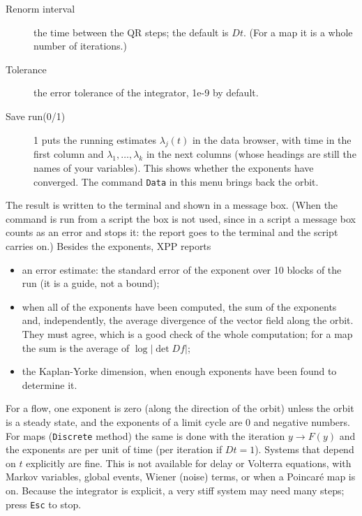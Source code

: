 \documentclass{article}
\begin{document}
\begin{description}
\begin{description}
\begin{description}
\item[Renorm interval] the time between the QR steps; the default is $Dt$.  (For a map it is a whole number of iterations.)
\item[Tolerance] the error tolerance of the integrator, 1e-9 by default.
\item[Save run(0/1)] 1 puts the running estimates $\lambda_j(t)$ in the data browser, with time in the first column and
$\lambda_1,\ldots,\lambda_k$ in the next columns (whose headings are still the names of your variables).  This shows whether the
exponents have converged.  The command {\tt Data} in this menu brings back the orbit.
\end{description}
The result is written to the terminal and shown in a message box.  (When the command is run from a script the box is not used,
since in a script a message box counts as an error and stops it: the report goes to the terminal and the script carries on.)
Besides the exponents, XPP reports
\begin{itemize}
\item an error estimate: the standard error of the exponent over 10 blocks of the run (it is a guide, not a bound);
\item when all of the exponents have been computed, the sum of the exponents and, independently, the average divergence of the vector field
along the orbit.  They must agree, which is a good check of the whole computation; for a map the sum is the average of
$\log|\det Df|$;
\item the Kaplan-Yorke dimension, when enough exponents have been found to determine it.
\end{itemize}
For a flow, one exponent is zero (along the direction of the orbit) unless the orbit is a steady state, and the
exponents of a limit cycle are $0$ and negative numbers.  For maps ({\tt Discrete} method) the same is done with the
iteration $y\to F(y)$ and the exponents are per unit of time (per iteration if $Dt=1$).  Systems that depend on $t$ explicitly are fine.
This is not available for delay or Volterra equations, with Markov variables, global events, Wiener (noise) terms, or when a
Poincar\'e map is on.  Because the integrator is explicit, a very stiff system may need many steps; press {\tt Esc} to stop.


\end{description}
\end{description}
\end{document}
